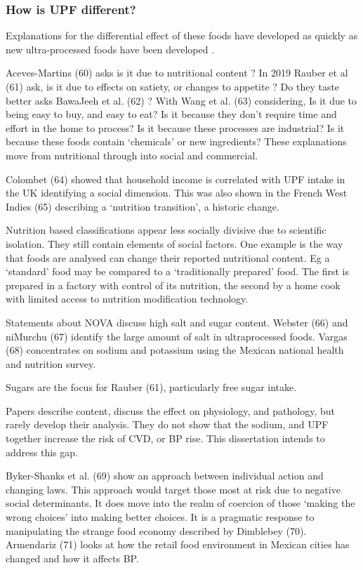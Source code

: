 \documentclass[
]{article}
\begin{document}
\hypertarget{how-is-upf-different}{%
\subsubsection{How is UPF different?}\label{how-is-upf-different}}

Explanations for the differential effect of these foods have developed
as quickly as new ultra-processed foods have been developed .

Aceves-Martins (60) asks is it due to nutritional content ? In 2019
Rauber et al (61) ask, is it due to effects on satiety, or changes to
appetite ? Do they taste better asks BawaJeeh et al. (62) ? With Wang et
al. (63) considering, Is it due to being easy to buy, and easy to eat?
Is it because they don't require time and effort in the home to process?
Is it because these processes are industrial? Is it because these foods
contain `chemicals' or new ingredients? These explanations move from
nutritional through into social and commercial.

Colombet (64) showed that household income is correlated with UPF intake
in the UK identifying a social dimension. This was also shown in the
French West Indies (65) describing a `nutrition transition', a historic
change.

Nutrition based classifications appear less socially divisive due to
scientific isolation. They still contain elements of social factors. One
example is the way that foods are analysed can change their reported
nutritional content. Eg a `standard' food may be compared to a
`traditionally prepared' food. The first is prepared in a factory with
control of its nutrition, the second by a home cook with limited access
to nutrition modification technology.

Statements about NOVA discuss high salt and sugar content. Webster (66)
and niMurchu (67) identify the large amount of salt in ultraprocessed
foods. Vargas (68) concentrates on sodium and potassium using the
Mexican national health and nutrition survey.

Sugars are the focus for Rauber (61), particularly free sugar intake.

Papers describe content, discuss the effect on physiology, and
pathology, but rarely develop their analysis. They do not show that the
sodium, and UPF together increase the risk of CVD, or BP rise. This
dissertation intends to address this gap.

Byker-Shanks et al. (69) show an approach between individual action and
changing laws. This approach would target those most at risk due to
negative social determinants. It does move into the realm of coercion of
those `making the wrong choices' into making better choices. It is a
pragmatic response to manipulating the strange food economy described by
Dimblebey (70). Armendariz (71) looks at how the retail food environment
in Mexican cities has changed and how it affects BP.
\end{document}

